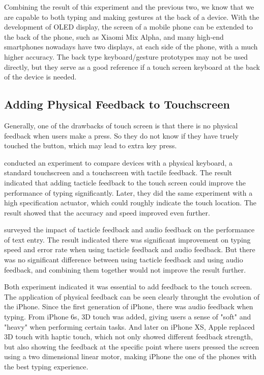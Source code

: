 \documentclass[11pt]{article}
\begin{document}
Combining the result of this experiment and the previous two, we know that we are capable to both typing and making gestures at the back of a device. With the development of OLED display, the screen of a mobile phone can be extended to the back of the phone, such as Xiaomi Mix Alpha, and many high-end smartphones nowadays have two displays, at each side of the phone, with a much higher accuracy. The back type keyboard/gesture prototypes may not be used directly, but they serve as a good reference if a touch screen keyboard at the back of the device is needed. 

\subsection{Adding Physical Feedback to Touchscreen}

Generally, one of the drawbacks of touch screen is that there is no physical feedback when users make a press. So they do not know if they have truely touched the button, which may lead to extra key press.

\citet{tactilefeedback2008} conducted an experiment to compare devices with a physical keyboard, a standard touchscreen and a touchscreen with tactile feedback. The result indicated that adding tacticle feedback to the touch screen could improve the performance of typing significantly. Later, they did the same experiment with a high specification actuator, which could roughly indicate the touch location. The result showed that the accuracy and speed improved even further. 

\citet{10.1145/1518701.1518750} surveyed the impact of tacticle feedback and audio feedback on the performance of text entry. The result indicated there was significant improvement on typing speed and error rate when using tacticle feedback and audio feedback. But there was no significant difference between using tacticle feedback and using audio feedback, and combining them together would not improve the result further. 

Both experiment indicated it was essential to add feedback to the touch screen. The application of physical feedback can be seen clearly throught the evolution of the iPhone. Since the first generation of iPhone, there was audio feedback when typing. From iPhone 6s, 3D touch was added, giving users a sense of "soft" and "heavy" when performing certain tasks. And later on iPhone XS, Apple replaced 3D touch with haptic touch, which not only showed different feedback strength, but also showing the feedback at the specific point where users pressed the screen using a two dimensional linear motor, making iPhone the one of the phones with the best typing experience.
\end{document}
